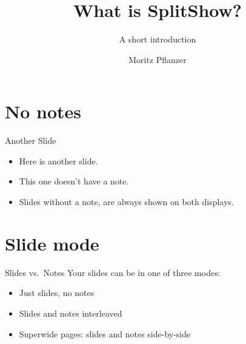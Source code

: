 \documentclass[14pt]{beamer}
\title{What is SplitShow?}
\subtitle{A short introduction}
\author{Moritz Pflanzer}
\begin{document}
\begin{frame}[plain]
    \titlepage


\end{frame}

\section{No notes}

\begin{frame}{Another Slide}
    \begin{itemize}
        \item Here is another slide.
        \item This one doesn't have a note.
        \item Slides without a note, are always shown on both displays.
    \end{itemize}
\end{frame}

\section{Slide mode}

\begin{frame}{Slides vs.\ Notes}
    Your slides can be in one of three modes:
    \begin{itemize}[<+->]
        \item Just slides, no notes
        \item Slides and notes interleaved
        \item Superwide pages: slides and notes side-by-side
    \end{itemize}
\end{frame}
\end{document}
